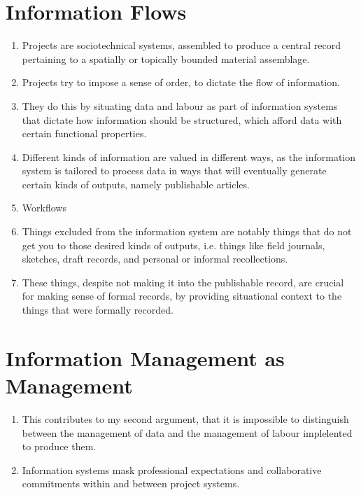 \documentclass{article}
\begin{document}
\section{Information Flows}
\begin{enumerate}
  \item Projects are sociotechnical systems, assembled to produce a central record pertaining to a spatially or topically bounded material assemblage.
  \item Projects try to impose a sense of order, to dictate the flow of information.
  \item They do this by situating data and labour as part of information systems that dictate how information should be structured, which afford data with certain functional properties.
  \item Different kinds of information are valued in different ways, as the information system is tailored to process data in ways that will eventually generate certain kinds of outputs, namely publishable articles.
  \item Workflows
  \item Things excluded from the information system are notably things that do not get you to those desired kinds of outputs, i.e. things like field journals, sketches, draft records, and personal or informal recollections.
  \item These things, despite not making it into the publishable record, are crucial for making sense of formal records, by providing situational context to the things that were formally recorded.
\end{enumerate}

\section{Information Management as Management}
\begin{enumerate}
  \item This contributes to my second argument, that it is impossible to distinguish between the management of data and the management of labour implelented to produce them.
  \item Information systems mask professional expectations and collaborative commitments within and between project systems.
\end{enumerate}
\end{document}
